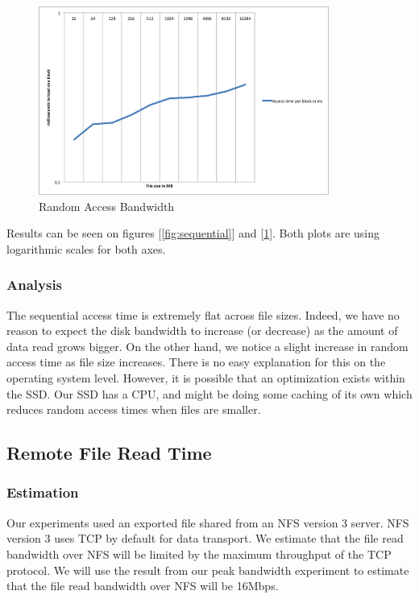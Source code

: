 \begin{figure}
 \centering
  \includegraphics[width=0.85\textwidth]{image/random_read.png}
  \caption{Random Access Bandwidth}
 \label{fig:random}
\end{figure}

Results can be seen on figures [\ref{fig:sequential}] and [\ref{fig:random}]. Both plots are using logarithmic scales for both axes.

\subsubsection{Analysis}

The sequential access time is extremely flat across file sizes. Indeed, we have no reason to expect the disk bandwidth to increase (or decrease) as the amount of data read grows bigger. On the other hand, we notice a slight increase in random access time as file size increases. There is no easy explanation for this on the operating system level. However, it is possible that an optimization exists within the SSD. Our SSD has a CPU, and might be doing some caching of its own which reduces random access times when files are smaller.

\subsection{Remote File Read Time}

\subsubsection{Estimation}

Our experiments used an exported file shared from an NFS version 3 server. NFS
version 3 uses TCP by default for data transport.  We estimate that the file
read bandwidth over NFS will be limited by the maximum throughput of the TCP
protocol. We will use the result from our peak bandwidth experiment to estimate 
that the file read bandwidth over NFS will be 16Mbps.

